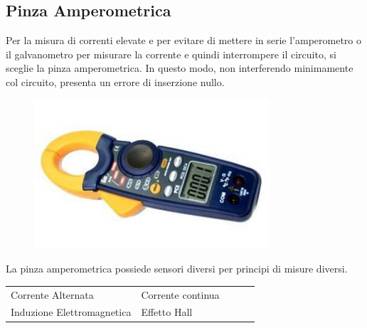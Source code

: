 \documentclass[a4paper, 15pt]{article}
\begin{document}
\subsection{Pinza Amperometrica}	
\begin{adjustwidth}{2in}{}
		Per la misura di correnti elevate e per evitare di mettere in serie l'amperometro o il galvanometro per misurare la corrente e quindi interrompere il circuito, si sceglie la pinza amperometrica. In questo modo, non interferendo minimamente col circuito, presenta un errore di inserzione nullo.  
\begin{figure}[H]
	\centering
	\includegraphics[width=0.3\linewidth]{fig/screenshot004}
	\label{fig:screenshot004}
\end{figure}
		La pinza amperometrica possiede sensori diversi per principi di misure diversi. 
\begin{flushright}
		\begin{table}[H]
			\begin{tabular}{|l|l|lll}
				\cline{1-2}
				Corrente Alternata                                                                                                                                                                                & Corrente continua                                                                                                                                                                                                                                                                                              &  &  &  \\ \cline{1-2}
				Induzione Elettromagnetica                                                                                                                                                                        & Effetto Hall                                                                                                                                                                                                                                                                                                   &  &  &  \\

\end{tabular}
\end{table}
\end{flushright}
\end{adjustwidth}
\end{document}
